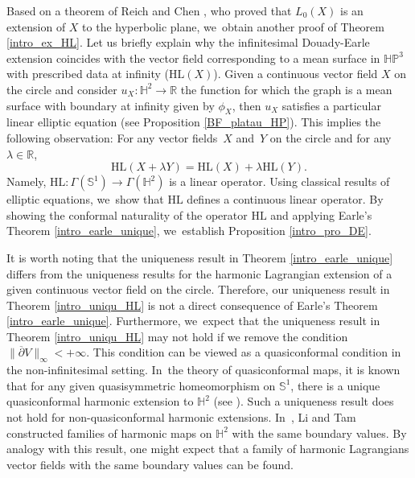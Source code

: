 \documentclass[10pt]{amsart}
\theoremstyle{plain}
\theoremstyle{definition}
\newcommand{\HP}{\mathbb{HP}^3}
\begin{document}
Based on a theorem of Reich and Chen \cite{Extension_with_bounded_derivative}, who proved that \(L_0(X) \) is an extension of \(X \) to the hyperbolic plane, we~obtain another proof of Theorem \ref{intro_ex_HL}. Let us briefly explain why the infinitesimal Douady-Earle extension coincides with the vector field corresponding to a mean surface in \(\HP\) with prescribed data at infinity (\ie $\mathrm{HL}(X)$). Given a continuous vector field \(X \) on the circle and consider \(u_X: \mathbb{H}^2 \to \mathbb{R} \) the function for which the graph is a mean surface with boundary at infinity given by \(\phi_X\), then \(u_X \) satisfies a particular linear elliptic equation (see Proposition \ref{BF_platau_HP}). This implies the following observation: For any vector fields~\(X \) and~\(Y \) on the circle and for any \(\lambda \in \mathbb{R}\),
\[
\mathrm{HL}(X + \lambda Y) = \mathrm{HL}(X) + \lambda \mathrm{HL}(Y).
\]
Namely, \(\mathrm{HL}: \Gamma(\mathbb{S}^1) \to \Gamma(\mathbb{H}^2)\) is
a linear operator. Using classical results of elliptic equations, we~show
that \(\mathrm{HL}\) defines a continuous linear operator. By showing the
conformal naturality of the operator \(\mathrm{HL}\) and applying Earle's
Theorem \ref{intro_earle_unique}, we~establish Proposition
\ref{intro_pro_DE}.

It is worth noting that the uniqueness result in Theorem \ref{intro_earle_unique} differs from the uniqueness results for the harmonic Lagrangian extension of a given continuous vector field on the circle. Therefore, our uniqueness result in Theorem \ref{intro_uniqu_HL} is not a direct consequence of Earle's Theorem \ref{intro_earle_unique}. Furthermore, we~expect that the uniqueness result in Theorem \ref{intro_uniqu_HL} may not hold if we remove the condition \(\lVert \overline{\partial} V \rVert_{\infty} < +\infty\). This condition can be viewed as a quasiconformal condition in the non-infinitesimal setting. In~the theory of quasiconformal maps, it is known that for any given quasisymmetric homeomorphism on \(\mathbb{S}^1\), there is a unique quasiconformal harmonic extension to \(\mathbb{H}^2\) (see \cite{LI_Tam1, Schoen_conjecture}). Such a uniqueness result does not hold for non-quasiconformal harmonic extensions. In~\cite{LI_Tam1, Li_Tam2}, Li and Tam constructed families of harmonic maps on \(\mathbb{H}^2\) with the same boundary values. By analogy with this result, one might expect that a family of harmonic Lagrangians vector fields with the same boundary values can be found.
\end{document}
